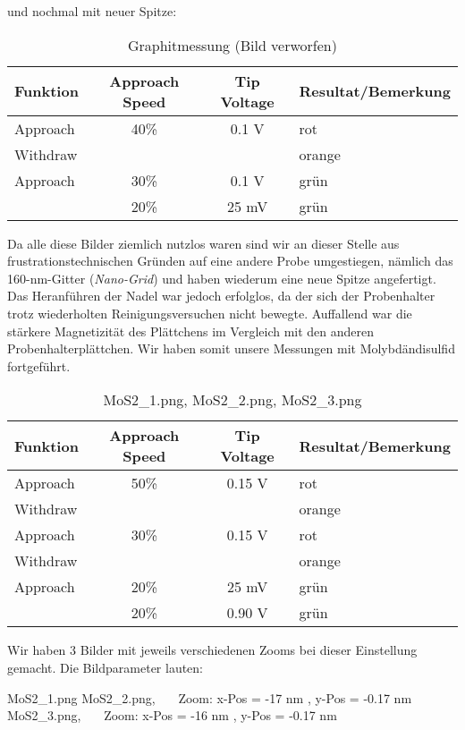 und nochmal mit neuer Spitze:

\begin{table}[H]
\caption{Graphitmessung (Bild verworfen)}
\centering \begin{tabular}[H]{l c c l} 
Funktion & Approach Speed & Tip Voltage & Resultat/Bemerkung\\ \hline
Approach & 40\% & 0.1 V & rot\\
Withdraw & & & orange\\
Approach & 30\% & 0.1 V & grün\\
 & 20\% & 25 mV & grün\\
\end{tabular}
\end{table}


Da alle diese Bilder ziemlich nutzlos waren sind wir an dieser Stelle aus frustrationstechnischen Gründen auf eine andere Probe umgestiegen, nämlich das 160-nm-Gitter (\emph{Nano-Grid}) und haben wiederum eine neue Spitze angefertigt. Das Heranführen der Nadel war jedoch erfolglos, da der sich der Probenhalter trotz wiederholten Reinigungsversuchen nicht bewegte. Auffallend war die stärkere Magnetizität des Plättchens im Vergleich mit den anderen Probenhalterplättchen. Wir haben somit unsere Messungen mit Molybdändisulfid fortgeführt.

\begin{table}[H]
\caption{MoS2\_1.png, MoS2\_2.png, MoS2\_3.png}
\centering \begin{tabular}[H]{l c c l} 
Funktion & Approach Speed & Tip Voltage & Resultat/Bemerkung\\ \hline
Approach & 50\% & 0.15 V & rot\\
Withdraw & & & orange\\
Approach & 30\% & 0.15 V & rot\\
Withdraw & & & orange\\
Approach & 20\% & 25 mV & grün\\
 & 20\% & 0.90 V & grün\\
\end{tabular}
\end{table}

Wir haben 3 Bilder mit jeweils verschiedenen Zooms bei dieser Einstellung gemacht. Die Bildparameter lauten:

MoS2\_1.png 
MoS2\_2.png, \ \ \ Zoom: x-Pos = -17 nm , y-Pos = -0.17 nm 
MoS2\_3.png, \ \ \ Zoom: x-Pos = -16 nm , y-Pos = -0.17 nm 

